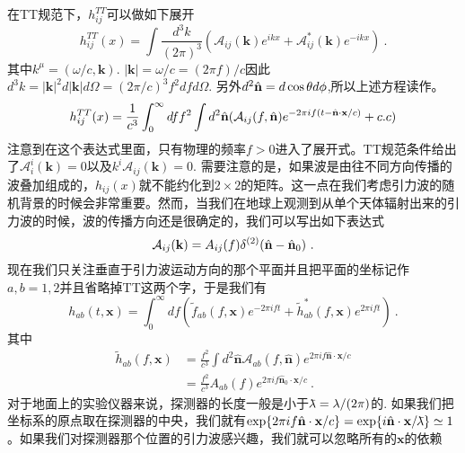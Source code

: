 在TT规范下，$h^{TT}_{ij}$可以做如下展开
\begin{equation}
h^{TT}_{ij}(x) = \int \frac{d^3 k}{(2\pi)^3} (\mathcal A_{ij}(\mathbf k) e^{ikx} + \mathcal A_{ij}^* (\mathbf k) e^{-i k x} ) ~. 
\end{equation}
其中$k^\mu = (\omega/c,\mathbf k)$. $|\mathbf k| = \omega/c = (2\pi f)/c$因此$d^3 k = |\mathbf k|^2 d|\mathbf k| d\Omega = (2\pi/c)^3 f^2 df d\Omega $. 另外$d^2\hat{\bf{n}} = d\cos\theta d\phi$,所以上述方程读作。
\begin{equation}
h^{TT}_{ij}(x) = \frac{1}{c^3} \int^\infty_0 df f^2 \int d^2 \hat{ \bf{n} } ( \mathcal A_{ij} (f,\hat{ \bf{n} }) e^{-2\pi i f(t-\hat{ {\bf n} } \cdot {\bf x} /c  )}  + {c.c} ) 
\end{equation}
注意到在这个表达式里面，只有物理的频率$f>0$进入了展开式。TT规范条件给出了$\mathcal A^i_i (\mathbf k) =0 $以及$k^i \mathcal A_{ij} (\mathbf k) =0 $. 需要注意的是，如果波是由往不同方向传播的波叠加组成的，$h_{ij}(x)$就不能约化到$2\times 2$的矩阵。这一点在我们考虑引力波的随机背景的时候会非常重要。然而，当我们在地球上观测到从单个天体辐射出来的引力波的时候，波的传播方向还是很确定的，我们可以写出如下表达式
\begin{equation}
\mathcal A_{ij} (\mathbf k) = A_{ij} (f) \delta^{(2)} (\hat{  \mathbf n } - \hat{ {\bf n} }_0 )~.
\end{equation}
现在我们只关注垂直于引力波运动方向的那个平面并且把平面的坐标记作$a,b = 1,2$并且省略掉TT这两个字，于是我们有
\begin{equation}
h_{ab} (t,\mathbf x ) = \int^\infty_0 df ( \tilde f_{ab} (f,\mathbf x) e^{-2\pi i f t} + \tilde h^*_{ab} (f,\mathbf x) e^{2\pi i f t} ) ~. 
\end{equation}
其中
\begin{equation}
\begin{aligned}
\tilde h_{ab} (f,\mathbf x) & = \frac{f^2}{c^3} \int d^2 \hat{  \mathbf n } \mathcal A_{ab} (f, \hat{\mathbf{n}}) e^{2\pi i f \hat{  \mathbf n } \cdot \mathbf x / c  } \\
& = \frac{f^2}{c^3} A_{ab} (f) e^{2\pi i f {\hat{\mathbf n}_0 \cdot \mathbf x /c  } }~.
\end{aligned}
\end{equation} 
对于地面上的实验仪器来说，探测器的长度一般是小于${\mkern0.7mu {\bar{\phantom{a}}} \mkern -11mu\lambda} = \lambda/(2\pi)$的. 如果我们把坐标系的原点取在探测器的中央，我们就有$\exp  \{   2\pi i f \hat{ \mathbf n } \cdot \mathbf x/c \} = \exp \{ i \hat{ {\bf n} } \cdot \mathbf x / {\mkern0.75mu {\bar{\phantom{a}}} \mkern -11.75mu\lambda} \} \simeq 1  $。如果我们对探测器那个位置的引力波感兴趣，我们就可以忽略所有的$\mathbf x$的依赖
